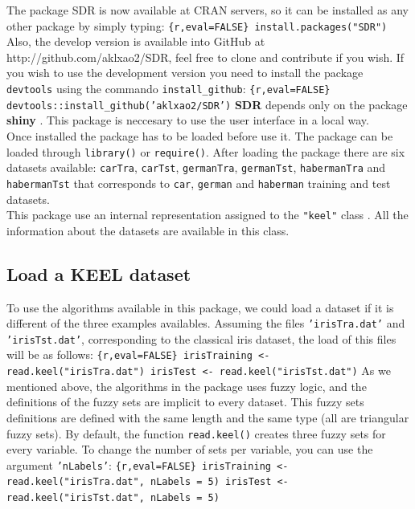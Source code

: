 \documentclass[]{article}
\begin{document}
The package SDR is now available at CRAN servers, so it can be installed
as any other package by simply typing:
\texttt{\{r,eval=FALSE\} install.packages("SDR")} Also, the develop
version is available into GitHub at http://github.com/aklxao2/SDR, feel
free to clone and contribute if you wish. If you wish to use the
development version you need to install the package \texttt{devtools}
using the commando \texttt{install\_github}:
\texttt{\{r,eval=FALSE\} devtools::install\_github('aklxao2/SDR')}
\textbf{SDR} depends only on the package \textbf{shiny} \cite{shiny}.
This package is neccesary to use the user interface in a local
way.\\Once installed the package has to be loaded before use it. The
package can be loaded through \texttt{library()} or \texttt{require()}.
After loading the package there are six datasets available:
\texttt{carTra}, \texttt{carTst}, \texttt{germanTra},
\texttt{germanTst}, \texttt{habermanTra} and \texttt{habermanTst} that
corresponds to \texttt{car}, \texttt{german} and \texttt{haberman}
training and test datasets.\\This package use an internal representation
assigned to the \texttt{"keel"} class . All the information about the
datasets are available in this class.

\subsection{Load a KEEL dataset}\label{load-a-keel-dataset}

To use the algorithms available in this package, we could load a dataset
if it is different of the three examples availables. Assuming the files
\texttt{'irisTra.dat'} and \texttt{'irisTst.dat'}, corresponding to the
classical iris dataset, the load of this files will be as follows:
\texttt{\{r,eval=FALSE\} irisTraining \textless{}- read.keel("irisTra.dat") irisTest \textless{}- read.keel("irisTst.dat")}
As we mentioned above, the algorithms in the package uses fuzzy logic,
and the definitions of the fuzzy sets are implicit to every dataset.
This fuzzy sets definitions are defined with the same length and the
same type (all are triangular fuzzy sets). By default, the function
\texttt{read.keel()} creates three fuzzy sets for every variable. To
change the number of sets per variable, you can use the argument
\texttt{'nLabels'}:
\texttt{\{r,eval=FALSE\} irisTraining \textless{}- read.keel("irisTra.dat", nLabels = 5) irisTest \textless{}- read.keel("irisTst.dat", nLabels = 5)}
\end{document}
